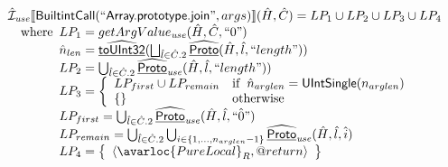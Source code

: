 \[\begin{array}{l}
\aI_{\it use}\lbr \SF{BuiltintCall}(``\SF{Array.prototype.join}",args)\rbr(\hat{H},\hat{C}) = LP_1 \cup LP_2 \cup LP_3 \cup LP_4\\
\quad\wherec{
  LP_1 = getArgValue_{\it use}(\hat{H},\hat{C}, ``0")\\
  \hat{n}_{len} = \ahf{toUInt32}(\bigsqcup_{\hat{l} \in \hat{C}.2}  \ahf{Proto}(\hat{H}, \hat{l}, ``length"))\\
  LP_2 = \bigcup_{\hat{l} \in \hat{C}.2} \ahf{Proto}_{\it use}(\hat{H}, \hat{l}, ``length"))\\
  LP_3 = \left\{\begin{array}{ll}
      LP_{first} \cup LP_{remain} & \ifc{\hat{n}_{arglen} = \SF{UIntSingle}(n_{arglen})}\\
      \set{} & \owc
    \end{array}\right.\\
  LP_{first} = \bigcup_{\hat{l} \in \hat{C}.2} \ahf{Proto}_{\it use}(\hat{H}, \hat{l}, \hat{``0"})\\
  LP_{remain} = \bigcup_{\hat{l} \in \hat{C}.2} \bigcup_{i \in \{1,...,n_{arglen}-1\}} \ahf{Proto}_{\it use}(\hat{H}, \hat{l}, \hat{i})\\
  LP_4 = \set{\langle\avarloc{PureLocal}_R,\varprop{return}\rangle}\\
  
  }\\
\\
\end{array}
\]
